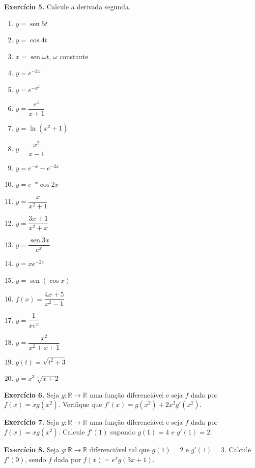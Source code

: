\documentclass[12pt,a4paper]{article}
\begin{document}
\vspace{0.5cm}
\noindent\textbf{Exercício 5.} Calcule a derivada segunda.
\begin{enumerate}
    \renewcommand{\theenumi}{\alph{enumi}}
    \renewcommand{\labelenumi}{\theenumi)}
    \item $y = \operatorname{sen} 5t$
    \item $y = \cos 4t$
    \item $x = \operatorname{sen}\omega t$, $\omega$ constante
    \item $y = e^{-3x}$
    \item $y = e^{-x^2}$
    \item $y = \dfrac{e^x}{x + 1}$
    \item $y = \ln(x^2 + 1)$
    \item $y = \dfrac{x^2}{x - 1}$
    \item $y = e^{-x} - e^{-2x}$
    \item $y = e^{-x}\cos 2x$
    \item $y = \dfrac{x}{x^2 + 1}$
    \item $y = \dfrac{3x + 1}{x^2 + x}$
    \item $y = \dfrac{\operatorname{sen} 3x}{e^x}$
    \item $y = xe^{-2x}$
    \item $y = \operatorname{sen}(\cos x)$
    \item $f(x) = \dfrac{4x + 5}{x^2 - 1}$
    \item $y = \dfrac{1}{xe^x}$
    \item $y = \dfrac{x^2}{x^2 + x + 1}$
    \item $g(t) = \sqrt{t^2 + 3}$
    \item $y = x^3 \sqrt[3]{x + 2}$
\end{enumerate}

\vspace{0.5cm}
\noindent\textbf{Exercício 6.}
Seja $g\colon \mathbb{R} \to \mathbb{R}$ uma função diferenciável e seja $f$ dada por $f(x) = xg(x^2)$. Verifique que $f'(x) = g(x^2) + 2x^2 g'(x^2)$.

\vspace{0.5cm}
\noindent\textbf{Exercício 7.}
Seja $g\colon \mathbb{R} \to \mathbb{R}$ uma função diferenciável e seja $f$ dada por $f(x) = xg(x^2)$. Calcule $f'(1)$ supondo $g(1) = 4$ e $g'(1) = 2$.

\vspace{0.5cm}
\noindent\textbf{Exercício 8.}
Seja $g\colon \mathbb{R} \to \mathbb{R}$ diferenciável tal que $g(1) = 2$ e $g'(1) = 3$. Calcule $f'(0)$, sendo $f$ dada por $f(x) = e^x g(3x + 1)$.
\end{document}
